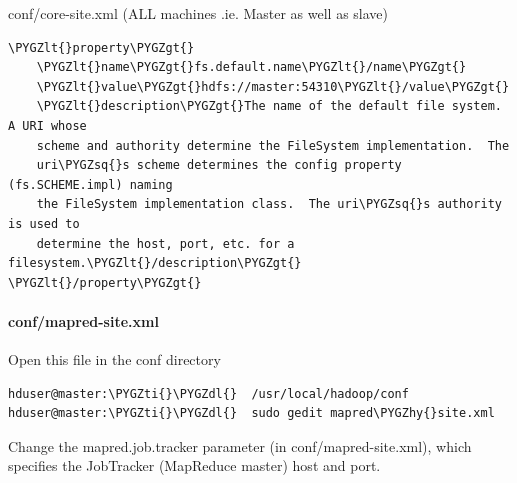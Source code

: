 \documentclass[letterpaper,10pt,english]{sphinxmanual}
\def\PYGZlt{\char`\<}
\def\PYGZgt{\char`\>}
\def\PYGZdl{\char`\$}
\def\PYGZhy{\char`\-}
\def\PYGZsq{\char`\'}
\def\PYGZti{\char`\~}
\begin{document}
conf/core-site.xml (ALL machines .ie. Master as well as slave)

\begin{Verbatim}[commandchars=\\\{\}]
\PYGZlt{}property\PYGZgt{}
    \PYGZlt{}name\PYGZgt{}fs.default.name\PYGZlt{}/name\PYGZgt{}
    \PYGZlt{}value\PYGZgt{}hdfs://master:54310\PYGZlt{}/value\PYGZgt{}
    \PYGZlt{}description\PYGZgt{}The name of the default file system.  A URI whose
    scheme and authority determine the FileSystem implementation.  The
    uri\PYGZsq{}s scheme determines the config property (fs.SCHEME.impl) naming
    the FileSystem implementation class.  The uri\PYGZsq{}s authority is used to
    determine the host, port, etc. for a filesystem.\PYGZlt{}/description\PYGZgt{}
\PYGZlt{}/property\PYGZgt{}
\end{Verbatim}
\begin{figure}[htbp]
\centering

\end{figure}


\paragraph{conf/mapred-site.xml}
\label{hadoop:conf-mapred-site-xml}
Open this file in the conf directory

\begin{Verbatim}[commandchars=\\\{\}]
hduser@master:\PYGZti{}\PYGZdl{}  /usr/local/hadoop/conf
hduser@master:\PYGZti{}\PYGZdl{}  sudo gedit mapred\PYGZhy{}site.xml
\end{Verbatim}

Change the mapred.job.tracker parameter (in conf/mapred-site.xml), which specifies the JobTracker (MapReduce master) host and port.
\end{document}
